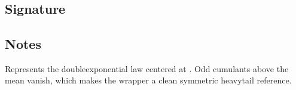 \documentclass[letterpaper,10pt,english]{sphinxmanual}
\begin{document}
\section{}
\label{\detokenize{object_api_reference:laplace}}

\subsection{Signature}
\label{\detokenize{object_api_reference:id34}}
\begin{sphinxVerbatim}[commandchars=\\\{\}]

\end{sphinxVerbatim}


\subsection{Notes}
\label{\detokenize{object_api_reference:id35}}
\sphinxAtStartPar
Represents the double\sphinxhyphen{}exponential law centered at . Odd cumulants above the mean vanish, which makes the wrapper a clean symmetric heavy\sphinxhyphen{}tail reference.
\end{document}
